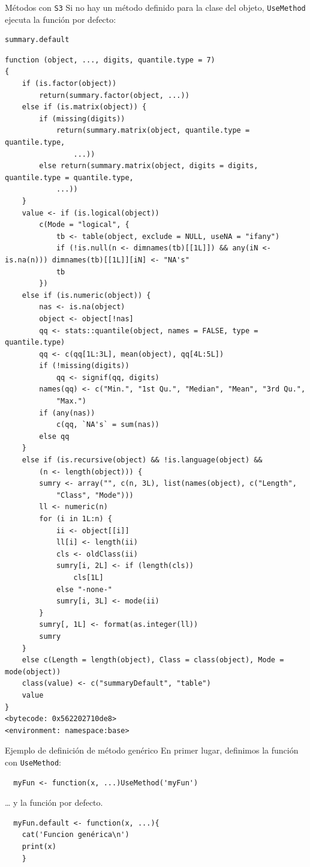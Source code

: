 \documentclass[xcolor={usenames,svgnames,dvipsnames}]{beamer}
\begin{document}
\begin{frame}[label={sec:org3b60a77},fragile]{Métodos con \texttt{S3}}
 Si no hay un método definido para la clase del objeto, \texttt{UseMethod} ejecuta la función por defecto:
\lstset{language=r,label= ,caption= ,captionpos=b,numbers=none}
\begin{lstlisting}
summary.default
\end{lstlisting}

\begin{verbatim}
function (object, ..., digits, quantile.type = 7) 
{
    if (is.factor(object)) 
        return(summary.factor(object, ...))
    else if (is.matrix(object)) {
        if (missing(digits)) 
            return(summary.matrix(object, quantile.type = quantile.type, 
                ...))
        else return(summary.matrix(object, digits = digits, quantile.type = quantile.type, 
            ...))
    }
    value <- if (is.logical(object)) 
        c(Mode = "logical", {
            tb <- table(object, exclude = NULL, useNA = "ifany")
            if (!is.null(n <- dimnames(tb)[[1L]]) && any(iN <- is.na(n))) dimnames(tb)[[1L]][iN] <- "NA's"
            tb
        })
    else if (is.numeric(object)) {
        nas <- is.na(object)
        object <- object[!nas]
        qq <- stats::quantile(object, names = FALSE, type = quantile.type)
        qq <- c(qq[1L:3L], mean(object), qq[4L:5L])
        if (!missing(digits)) 
            qq <- signif(qq, digits)
        names(qq) <- c("Min.", "1st Qu.", "Median", "Mean", "3rd Qu.", 
            "Max.")
        if (any(nas)) 
            c(qq, `NA's` = sum(nas))
        else qq
    }
    else if (is.recursive(object) && !is.language(object) && 
        (n <- length(object))) {
        sumry <- array("", c(n, 3L), list(names(object), c("Length", 
            "Class", "Mode")))
        ll <- numeric(n)
        for (i in 1L:n) {
            ii <- object[[i]]
            ll[i] <- length(ii)
            cls <- oldClass(ii)
            sumry[i, 2L] <- if (length(cls)) 
                cls[1L]
            else "-none-"
            sumry[i, 3L] <- mode(ii)
        }
        sumry[, 1L] <- format(as.integer(ll))
        sumry
    }
    else c(Length = length(object), Class = class(object), Mode = mode(object))
    class(value) <- c("summaryDefault", "table")
    value
}
<bytecode: 0x562202710de8>
<environment: namespace:base>
\end{verbatim}
\end{frame}

\begin{frame}[label={sec:orga16c444},fragile]{Ejemplo de definición de método genérico}
 En primer lugar, definimos la función con \texttt{UseMethod}:
\lstset{language=r,label= ,caption= ,captionpos=b,numbers=none}
\begin{lstlisting}
  myFun <- function(x, ...)UseMethod('myFun')
\end{lstlisting}

\ldots{} y la función por defecto.
\lstset{language=r,label= ,caption= ,captionpos=b,numbers=none}
\begin{lstlisting}
  myFun.default <- function(x, ...){
    cat('Funcion genérica\n')
    print(x)
    }
\end{lstlisting}
\end{frame}
\end{document}
